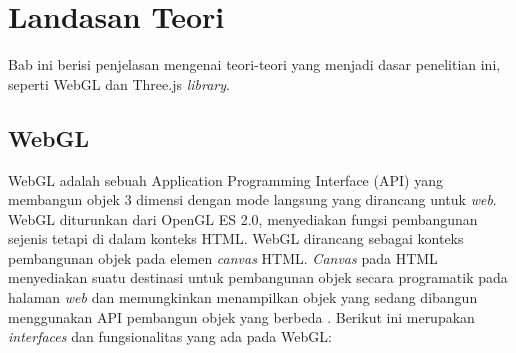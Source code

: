 \chapter{Landasan Teori}
\label{chap:teori}
Bab ini berisi penjelasan mengenai teori-teori yang menjadi dasar penelitian ini, seperti WebGL dan Three.js \textit{library}.

\section{WebGL}
\label{sec:webgl} 

WebGL adalah sebuah Application Programming Interface (API) yang membangun objek 3 dimensi dengan mode langsung yang dirancang untuk {\it web}. WebGL diturunkan dari OpenGL ES 2.0, menyediakan fungsi pembangunan sejenis tetapi di dalam konteks HTML. WebGL dirancang sebagai konteks pembangunan objek pada elemen {\it canvas} HTML. {\it Canvas} pada HTML menyediakan suatu destinasi untuk pembangunan objek secara programatik pada halaman {\it web} dan memungkinkan menampilkan objek yang sedang dibangun menggunakan API pembangun objek yang berbeda \cite{webgl}. Berikut ini merupakan {\it interfaces} dan fungsionalitas yang ada pada WebGL:
